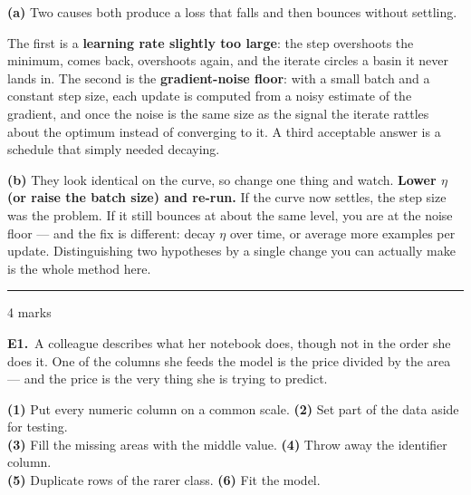\documentclass[10pt,a4paper]{article}
\newcommand{\parthead}[2]{\vspace{2pt}\noindent\rule{\linewidth}{0.4pt}\par\vspace{2pt}%
  \noindent{\bfseries Part #1}\hfill{\small #2}\par\vspace{1pt}}
\begin{document}
\textbf{(a)} Two causes both produce a loss that falls and then bounces without settling.\par\vspace{1mm}The first is a \textbf{learning rate slightly too large}: the step overshoots the minimum, comes back, overshoots again, and the iterate circles a basin it never lands in. The second is the \textbf{gradient-noise floor}: with a small batch and a constant step size, each update is computed from a noisy estimate of the gradient, and once the noise is the same size as the signal the iterate rattles about the optimum instead of converging to it. A third acceptable answer is a schedule that simply needed decaying.\par\vspace{1mm}\textbf{(b)} They look identical on the curve, so change one thing and watch. \textbf{Lower $\eta$ (or raise the batch size) and re-run.} If the curve now settles, the step size was the problem. If it still bounces at about the same level, you are at the noise floor --- and the fix is different: decay $\eta$ over time, or average more examples per update. Distinguishing two hypotheses by a single change you can actually make is the whole method here.

\newpage

\parthead{E --- Reasoning}{4 marks}

\textbf{E1.}\ A colleague describes what her notebook does, though not in the order she does it. One of the columns
she feeds the model is the price divided by the area --- and the price is the very thing she is trying to
predict.

\vspace{2mm}
\hspace*{4mm}\textbf{(1)} Put every numeric column on a common scale. \quad \textbf{(2)} Set part of the data aside for testing.\\
\hspace*{4mm}\textbf{(3)} Fill the missing areas with the middle value. \quad \textbf{(4)} Throw away the identifier column.\\
\hspace*{4mm}\textbf{(5)} Duplicate rows of the rarer class. \quad \textbf{(6)} Fit the model.

\vspace{4pt}
\end{document}
